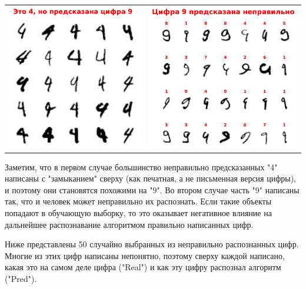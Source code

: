 \documentclass{article}
\begin{document}
\begin{tabular}{cc}
    \includegraphics[width=7.2cm]{TASK1 PRAC FIGURE 4-1.pdf}
    & 
    \includegraphics[width=8cm]{TASK1 PRAC FIGURE 4-2.pdf}\\
\end{tabular}

Заметим, что в первом случае большинство неправильно предсказанных "4"{ }написаны с{ }"замыканием"{ }сверху (как печатная, а не письменная версия цифры), и поэтому они становятся похожими на "9".
Во втором случае часть "9"{ }написаны так, что и человек может неправильно их распознать. Если такие объекты попадают в обучающую выборку, то это оказывает негативное влияние на дальнейшее распознавание алгоритмом правильно написанных цифр. 

Ниже представлены 50 случайно выбранных из неправильно распознанных цифр. Многие из этих цифр написаны непонятно, поэтому сверху каждой написано, какая это на самом деле цифра ("Real") и как эту цифру распознал алгоритм ("Pred"). 
\end{document}
